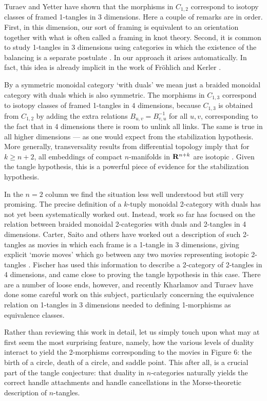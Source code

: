 Turaev and Yetter \cite{Turaev,Yetter} have shown that the morphisms
in $C_{1,2}$ correspond to isotopy classes of framed 1-tangles in 3
dimensions.  Here a couple of remarks are in order.  First, in this
dimension, our sort of framing is equivalent to an orientation
together with what is often called a framing in knot theory.  Second,
it is common to study 1-tangles in 3 dimensions using categories in
which the existence of the balancing is a separate postulate
\cite{CP}.  In our approach it arises automatically.  In fact, this
idea is already implicit in the work of Fr\"ohlich and Kerler
\cite{FK}.

By a symmetric monoidal category `with duals' we mean just a
braided monoidal category with duals which is also symmetric.
The morphisms in $C_{1,3}$ correspond to isotopy classes of
framed 1-tangles in $4$ dimensions, because $C_{1,3}$ is obtained
from $C_{1,2}$ by  adding the extra relations $B_{u,v} =
B_{v,u}^{-1}$ for all $u,v$, corresponding to the fact that in 4
dimensions there is room to unlink all links.  The same is true
in all higher dimensions --- as one would expect from the
stabilization hypothesis.  More generally, transversality results
from differential topology imply that for $k \ge n+2$, all
embeddings of compact $n$-manifolds in ${\bf R}^{n+k}$ are isotopic
\cite{Hirsch}.  Given the tangle hypothesis, this is a powerful
piece of evidence for the stabilization hypothesis.

In the $n = 2$ column we find the situation less well understood
but still very promising.  The precise definition of a $k$-tuply
monoidal 2-category with duals has not yet been systematically
worked out.   Instead, work so far has focused on the relation
between braided monoidal 2-categories with duals and 2-tangles in
4 dimensions.   Carter, Saito and others have worked out a
description of such 2-tangles as movies in which each frame is a
1-tangle in 3 dimensions, giving explicit `movie moves' which go
between any two movies representing isotopic 2-tangles \cite{CS}.
Fischer \cite{Fischer} has used this information to describe a
2-category of 2-tangles in 4 dimensions, and came close to
proving the tangle hypothesis in this case.   There are a number
of loose ends, however, and recently Kharlamov and Turaev
\cite{KT} have done some careful work on this subject,
particularly concerning the equivalence relation on 1-tangles in
3 dimensions needed to defining 1-morphisms as equivalence
classes.

Rather than reviewing this work in detail, let us simply touch upon
what may at first seem the most surprising feature, namely, how
the various levels of duality interact to yield the 2-morphisms
corresponding to the movies in Figure 6: the birth of a
circle, death of a circle, and saddle point.   This after all, is a
crucial part of the tangle conjecture: that duality in $n$-categories
naturally yields the correct handle attachments and handle
cancellations in the Morse-theoretic description of $n$-tangles.

